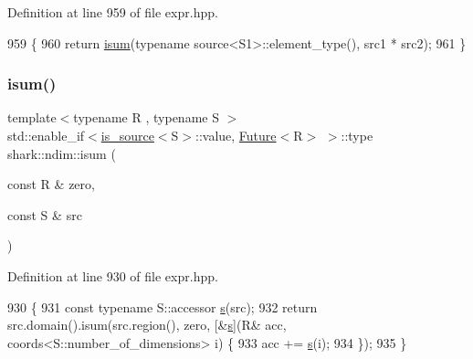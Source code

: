 Definition at line 959 of file expr.\+hpp.


\begin{DoxyCode}
959                                                                                                            
                                                     \{
960             \textcolor{keywordflow}{return} \hyperlink{namespaceshark_1_1ndim_a1628755d0773dcf15427e7bd60173d42}{isum}(\textcolor{keyword}{typename} source<S1>::element\_type(), src1 * src2);
961         \}
\end{DoxyCode}
\hypertarget{namespaceshark_1_1ndim_a1628755d0773dcf15427e7bd60173d42}{}\label{namespaceshark_1_1ndim_a1628755d0773dcf15427e7bd60173d42} 
\subsubsection{\texorpdfstring{isum()}{isum()}}
{\footnotesize\ttfamily template$<$typename R , typename S $>$ \\
std\+::enable\+\_\+if$<$\hyperlink{classshark_1_1ndim_1_1is__source}{is\+\_\+source}$<$S$>$\+::value, \hyperlink{structshark_1_1_future}{Future}$<$R$>$ $>$\+::type shark\+::ndim\+::isum (\begin{DoxyParamCaption}\item[{const R \&}]{zero,  }\item[{const S \&}]{src }\end{DoxyParamCaption})}



Definition at line 930 of file expr.\+hpp.


\begin{DoxyCode}
930                                                                                                   \{
931             \textcolor{keyword}{const} \textcolor{keyword}{typename} S::accessor \hyperlink{classshark_1_1_group_a6c59f34c15be2873372cd006c2939da2}{s}(src);
932             \textcolor{keywordflow}{return} src.domain().isum(src.region(), zero, [&\hyperlink{classshark_1_1_group_a6c59f34c15be2873372cd006c2939da2}{s}](R& acc, coords<S::number\_of\_dimensions> i) \{
933                 acc += \hyperlink{classshark_1_1_group_a6c59f34c15be2873372cd006c2939da2}{s}(i);
934             \});
935         \}
\end{DoxyCode}
\hypertarget{namespaceshark_1_1ndim_ab3a86aa005a8963555dcb303cfc0e0c9}{}\label{namespaceshark_1_1ndim_ab3a86aa005a8963555dcb303cfc0e0c9} 
